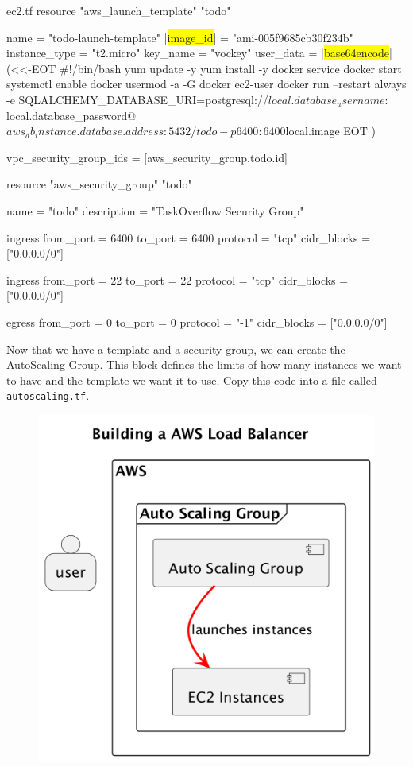 \documentclass{csse4400}
\begin{document}
\begin{code}[language=terraform,numbers=none,escapechar=|,keepspaces=true]{ec2.tf}
resource "aws_launch_template" "todo" {
  name          = "todo-launch-template"
  |\colorbox{yellow}{image\_id}|     = "ami-005f9685cb30f234b"
  instance_type = "t2.micro"
  key_name      = "vockey"
  user_data     = |\colorbox{yellow}{base64encode}|(<<-EOT
    #!/bin/bash
    yum update -y
    yum install -y docker
    service docker start
    systemctl enable docker
    usermod -a -G docker ec2-user 
    docker run --restart always -e SQLALCHEMY_DATABASE_URI=postgresql://${local.database_username}:${local.database_password}@${aws_db_instance.database.address}:5432/todo -p 6400:6400 ${local.image}
EOT
  )

  vpc_security_group_ids = [aws_security_group.todo.id]
}


resource "aws_security_group" "todo" {
  name          = "todo"
  description   = "TaskOverflow Security Group"

  ingress {
    from_port   = 6400
    to_port     = 6400
    protocol    = "tcp"
    cidr_blocks = ["0.0.0.0/0"]
  }

  ingress {
    from_port   = 22
    to_port     = 22
    protocol    = "tcp"
    cidr_blocks = ["0.0.0.0/0"]
  }

  egress {
    from_port   = 0
    to_port     = 0
    protocol    = "-1"
    cidr_blocks = ["0.0.0.0/0"]
  }
}
\end{code}

Now that we have a template and a security group, we can create the AutoScaling Group. This block defines the limits of how many instances we want to have and the template we want it to use. Copy this code into a file called \texttt{autoscaling.tf}.

\begin{figure}[H]
  \begin{center}
    \includegraphics[scale=0.2]{diagrams/lb1}
  \end{center}
\end{figure}
\end{document}
